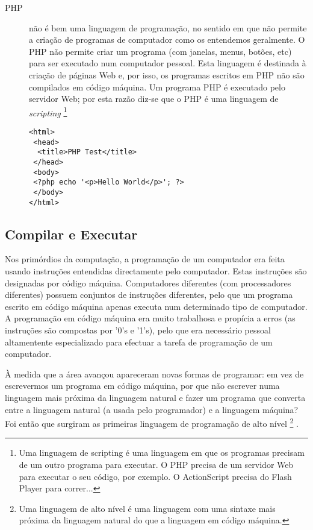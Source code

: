 \begin{description}
\item[PHP]  não é bem uma linguagem de programação, no sentido em que não permite a criação de programas de computador como os entendemos geralmente. O PHP não permite criar um programa (com janelas, menus, botões, etc) para ser executado num computador pessoal. Esta linguagem é destinada à criação de páginas Web e, por isso, os programas escritos em PHP não são compilados em código máquina. Um programa PHP é executado pelo servidor Web; por esta razão diz-se que o PHP é uma linguagem de \emph{scripting}%
\footnote{Uma linguagem de scripting é uma linguagem em que os programas precisam de um outro programa para executar. O PHP precisa de um servidor Web para executar o seu código, por exemplo. O ActionScript precisa do Flash Player para correr...}

\begin{lstlisting}
<html>
 <head>
  <title>PHP Test</title>
 </head>
 <body>
 <?php echo '<p>Hello World</p>'; ?> 
 </body>
</html>
\end{lstlisting}


\end{description}

\subsection{Compilar e Executar}
Nos primórdios da computação, a programação de um computador era feita usando instruções entendidas directamente pelo computador. Estas instruções são designadas por código máquina. Computadores diferentes (com processadores diferentes) possuem conjuntos de instruções diferentes, pelo que um programa escrito em código máquina apenas executa num determinado tipo de computador. 
A programação em código máquina era muito trabalhosa e propícia a erros (as instruções são compostas por '0's e '1's), pelo que era necessário pessoal altamentente especializado para efectuar a tarefa de programação de um computador.

À medida que a área avançou apareceram novas formas de programar: em vez de escrevermos um programa em código máquina, por que não escrever numa linguagem mais próxima da linguagem natural e fazer um programa que converta entre a linguagem natural (a usada pelo programador) e a linguagem máquina? Foi então que surgiram as primeiras linguagem de programação de alto nível%
\footnote{Uma linguagem de alto nível é uma linguagem com uma sintaxe mais próxima da linguagem natural do que a linguagem em código máquina.}%
.

